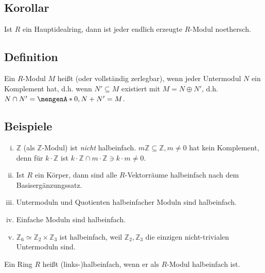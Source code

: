 \subsection[Korollar: Endlich erzeugte Moduln über einem Hauptidealring]{Korollar} %
\label{sub:216}
Ist $R$ ein Hauptidealring, dann ist jeder endlich erzeugte $R$-Modul noethersch.

\subsection[Definition: Halbeinfacher Modul]{Definition} %
\label{sub:217}
Ein $R$-Modul $M$ heißt  (oder vollständig zerlegbar), wenn jeder Untermodul $N$ ein Komplement hat, d.h. wenn $N' \subseteq M$ existiert mit $M = N \oplus N'$, d.h. $N \cap N' = \set{0}, N+ N' = M $.

\subsection[Beispiele halbeinfacher Moduln]{Beispiele} %
\label{sub:218}
\begin{enumerate}[(i)]
	\item $\mathds{Z}$ (als $\mathds{Z}$-Modul) ist \emph{nicht} halbeinfach. $m \mathds{Z} \subseteq \mathds{Z}, m \not= 0$ hat kein Komplement, denn für 
	$k \cdot \mathds{Z}$ ist $k \cdot \mathds{Z} \cap m \cdot \mathds{Z} \ni k \cdot m \not= 0$.
	\item Ist $R$ ein Körper, dann sind alle $R$-Vektorräume halbeinfach nach dem Basisergänzungssatz.
	\item Untermoduln und Quotienten halbeinfacher Moduln sind halbeinfach.
	\item Einfache Moduln sind halbeinfach.
	\item $\mathds{Z}_6 \simeq \mathds{Z}_2 \times \mathds{Z}_3$ ist halbeinfach, weil $\mathds{Z}_2, \mathds{Z}_3$ die einzigen nicht-trivialen Untermoduln sind.
\end{enumerate}
Ein Ring $R$ heißt (links-)halbeinfach, wenn er als $R$-Modul halbeinfach ist.

